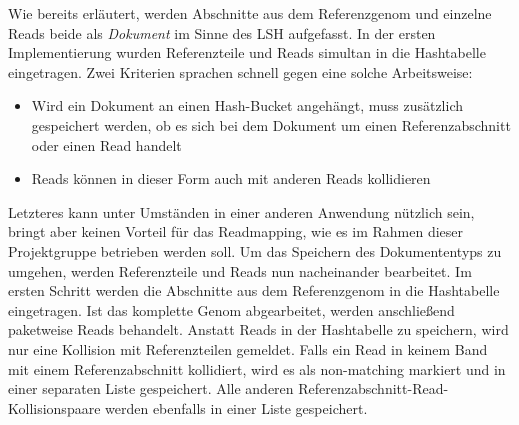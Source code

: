 Wie bereits erläutert, werden Abschnitte aus dem Referenzgenom und einzelne Reads beide als \textit{Dokument} im Sinne des LSH aufgefasst.
In der ersten Implementierung wurden Referenzteile und Reads simultan in die Hashtabelle eingetragen.
Zwei Kriterien sprachen schnell gegen eine solche Arbeitsweise:
\begin{itemize}
	\item Wird ein Dokument an einen Hash-Bucket angehängt, muss zusätzlich gespeichert werden, ob es sich bei dem Dokument um einen Referenzabschnitt oder einen Read handelt
	\item Reads können in dieser Form auch mit anderen Reads kollidieren
\end{itemize}
Letzteres kann unter Umständen in einer anderen Anwendung nützlich sein, bringt aber keinen Vorteil für das Readmapping, wie es im Rahmen dieser Projektgruppe betrieben werden soll.
Um das Speichern des Dokumententyps zu umgehen, werden Referenzteile und Reads nun nacheinander bearbeitet.
Im ersten Schritt werden die Abschnitte aus dem Referenzgenom in die Hashtabelle eingetragen.
Ist das komplette Genom abgearbeitet, werden anschließend paketweise Reads behandelt.
Anstatt Reads in der Hashtabelle zu speichern, wird nur eine Kollision mit Referenzteilen gemeldet.
Falls ein Read in keinem Band mit einem Referenzabschnitt kollidiert, wird es als non-matching markiert und in einer separaten Liste gespeichert.
Alle anderen Referenzabschnitt-Read-Kollisionspaare werden ebenfalls in einer Liste gespeichert.
\\

